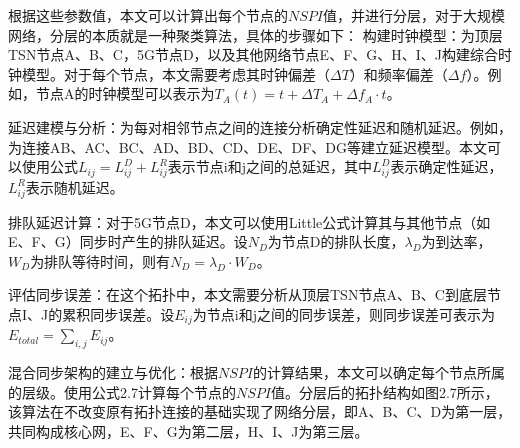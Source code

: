 \documentclass[UTF8,a4paper,12pt]{ctexart}
\numberwithin{equation}{section}
\begin{document}
	根据这些参数值，本文可以计算出每个节点的$NSPI$值，并进行分层，对于大规模网络，分层的本质就是一种聚类算法，具体的步骤如下：
	构建时钟模型：为顶层TSN节点A、B、C，5G节点D，以及其他网络节点E、F、G、H、I、J构建综合时钟模型。对于每个节点，本文需要考虑其时钟偏差（$\Delta T$）和频率偏差（$\Delta f$）。例如，节点A的时钟模型可以表示为$T_A(t) = t + \Delta T_A + \Delta f_A \cdot t$。
	
	延迟建模与分析：为每对相邻节点之间的连接分析确定性延迟和随机延迟。例如，为连接AB、AC、BC、AD、BD、CD、DE、DF、DG等建立延迟模型。本文可以使用公式$L_{ij} = L_{ij}^D + L_{ij}^R$表示节点i和j之间的总延迟，其中$L_{ij}^D$表示确定性延迟，$L_{ij}^R$表示随机延迟。
	
	排队延迟计算：对于5G节点D，本文可以使用Little公式计算其与其他节点（如E、F、G）同步时产生的排队延迟。设$N_D$为节点D的排队长度，$\lambda_D$为到达率，$W_D$为排队等待时间，则有$N_D = \lambda_D \cdot W_D$。
	
	评估同步误差：在这个拓扑中，本文需要分析从顶层TSN节点A、B、C到底层节点I、J的累积同步误差。设$E_{ij}$为节点i和j之间的同步误差，则同步误差可表示为$E_{total} = \sum_{i,j} E_{ij}$。
	
	混合同步架构的建立与优化：根据$NSPI$的计算结果，本文可以确定每个节点所属的层级。使用公式2.7计算每个节点的$NSPI$值。分层后的拓扑结构如图2.7所示，该算法在不改变原有拓扑连接的基础实现了网络分层，即A、B、C、D为第一层，共同构成核心网，E、F、G为第二层，H、I、J为第三层。
	\begin{figure}[H]
	\end{figure}
	
\end{document}
